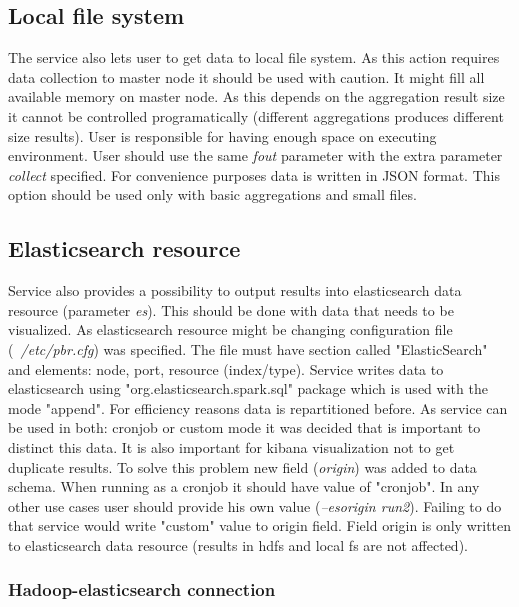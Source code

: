 \subsection{Local file system}

The service also lets user to get data to local file system. As this action requires data collection to master node it should be used with caution. It might fill all 
available memory on master node. As this depends on the aggregation result size it cannot be controlled programatically (different aggregations produces different size 
results). User is responsible for having enough space on executing environment. User should use the same \textit{fout} parameter with the extra parameter \textit{collect} 
specified. For convenience purposes data is written in JSON format. This option should be used only with basic aggregations and small files.

\subsection{Elasticsearch resource}

Service also provides a possibility to output results into elasticsearch data resource (parameter \textit{es}). This should be done with data that needs to be visualized. As elasticsearch 
resource might be changing configuration file (\textit{~/etc/pbr.cfg}) was specified. The file must have section called "ElasticSearch" and elements: node, port, 
resource (index/type). Service writes data to elasticsearch using "org.elasticsearch.spark.sql" package which is used with the mode "append". For efficiency reasons 
data is repartitioned before. As service can be used in both: cronjob or custom mode it was decided that is important to distinct this data. It is also important for 
kibana visualization not to get duplicate results. To solve this problem new field (\textit{origin}) was added to data schema. When running as a cronjob it should have 
value of "cronjob". In any other use cases user should provide his own value (\textit{--esorigin run2}). Failing to do that service would write "custom" value to origin field.
Field origin is only written to elasticsearch data resource (results in hdfs and local fs are not affected).

\subsubsection{Hadoop-elasticsearch connection}


